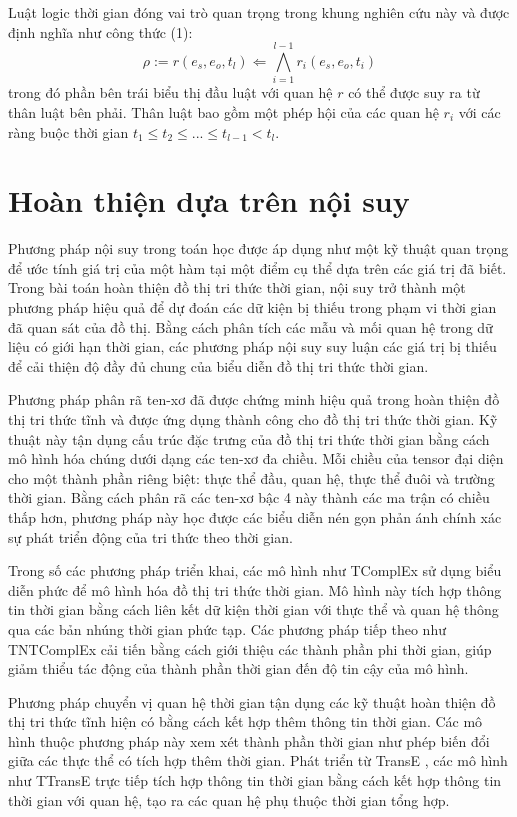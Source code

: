 Luật logic thời gian \cite{ref_article23} đóng vai trò quan trọng trong khung nghiên cứu này và được định nghĩa như công thức (1): 
\[
\rho := r(e_s, e_o, t_l) \Leftarrow \bigwedge_{i=1}^{l-1} r_i(e_s, e_o, t_i)
\]
trong đó phần bên trái biểu thị đầu luật với quan hệ \( r \) có thể được suy ra từ thân luật bên phải. Thân luật bao gồm một phép hội của các quan hệ \( r_i \) với các ràng buộc thời gian \( t_1 \leq t_2 \leq ... \leq t_{l-1} < t_l \).

\section{Hoàn thiện dựa trên nội suy}

Phương pháp nội suy trong toán học \cite{ref_article29} được áp dụng như một kỹ thuật quan trọng để ước tính giá trị của một hàm tại một điểm cụ thể dựa trên các giá trị đã biết. Trong bài toán hoàn thiện đồ thị tri thức thời gian, nội suy trở thành một phương pháp hiệu quả để dự đoán các dữ kiện bị thiếu trong phạm vi thời gian đã quan sát của đồ thị. Bằng cách phân tích các mẫu và mối quan hệ trong dữ liệu có giới hạn thời gian, các phương pháp nội suy suy luận các giá trị bị thiếu để cải thiện độ đầy đủ chung của biểu diễn đồ thị tri thức thời gian.

Phương pháp phân rã ten-xơ đã được chứng minh hiệu quả trong hoàn thiện đồ thị tri thức tĩnh và được ứng dụng thành công cho đồ thị tri thức thời gian. Kỹ thuật này tận dụng cấu trúc đặc trưng của đồ thị tri thức thời gian bằng cách mô hình hóa chúng dưới dạng các ten-xơ đa chiều. Mỗi chiều của tensor đại diện cho một thành phần riêng biệt: thực thể đầu, quan hệ, thực thể đuôi và trường thời gian. Bằng cách phân rã các ten-xơ bậc 4 này thành các ma trận có chiều thấp hơn, phương pháp này học được các biểu diễn nén gọn phản ánh chính xác sự phát triển động của tri thức theo thời gian.

Trong số các phương pháp triển khai, các mô hình như TComplEx \cite{ref_article31} sử dụng biểu diễn phức để mô hình hóa đồ thị tri thức thời gian. Mô hình này tích hợp thông tin thời gian bằng cách liên kết dữ kiện thời gian với thực thể và quan hệ thông qua các bản nhúng thời gian phức tạp. Các phương pháp tiếp theo như TNTComplEx \cite{ref_article31} cải tiến bằng cách giới thiệu các thành phần phi thời gian, giúp giảm thiểu tác động của thành phần thời gian đến độ tin cậy của mô hình.

Phương pháp chuyển vị quan hệ thời gian tận dụng các kỹ thuật hoàn thiện đồ thị tri thức tĩnh hiện có bằng cách kết hợp thêm thông tin thời gian. Các mô hình thuộc phương pháp này xem xét thành phần thời gian như phép biến đổi giữa các thực thể có tích hợp thêm thời gian. Phát triển từ TransE \cite{ref_article32}, các mô hình như TTransE \cite{ref_article32} trực tiếp tích hợp thông tin thời gian bằng cách kết hợp thông tin thời gian với quan hệ, tạo ra các quan hệ phụ thuộc thời gian tổng hợp.

